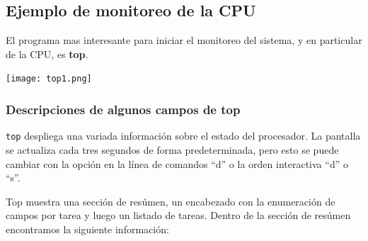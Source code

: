 \documentclass[12pt]{article}
\begin{document}
\subsection*{Ejemplo de monitoreo de la CPU}

El programa mas interesante para iniciar el monitoreo del sistema, y en 
particular de la CPU, es \textbf{top}.


\begin{center}
 \texttt{[image: top1.png]}
\end{center}

\subsubsection*{Descripciones de algunos campos de top}
\texttt{top} despliega  una variada información sobre el estado del 
procesador. La pantalla se actualiza cada tres segundos de forma 
predeterminada, pero esto se puede cambiar con la opción en la línea de 
comandos ``d'' o la orden interactiva ``d'' o ``s''.

Top muestra una sección de resúmen, un encabezado con la enumeración de
campos por tarea y luego un listado de tareas. Dentro de la sección de
resúmen encontramos la siguiente información:  
\end{document}
